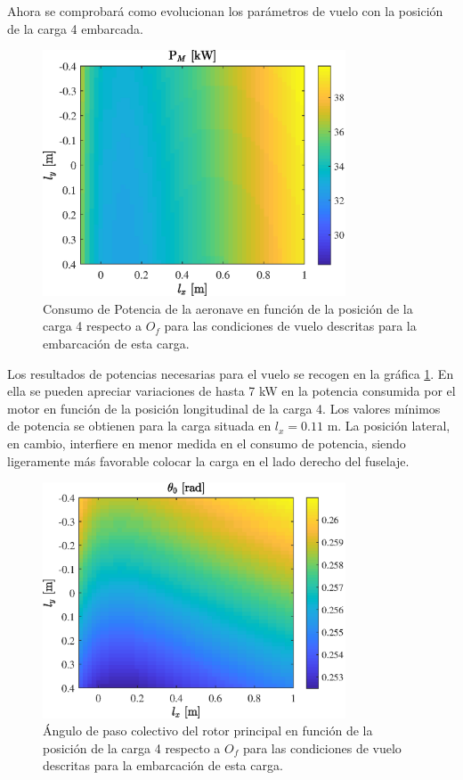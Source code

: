 Ahora se comprobará como evolucionan los parámetros de vuelo con la posición de la carga 4 embarcada.

\begin{figure}
	\centering
	\includegraphics[width=90mm]{graficos/PMSP}
	\caption{Consumo de Potencia de la aeronave en función de la posición de la carga 4 respecto a $O_f$ para las condiciones de vuelo descritas para la embarcación de esta carga.}
	\label{PMSP}
\end{figure}

Los resultados de potencias necesarias para el vuelo se recogen en la gráfica \ref{PMSP}. En ella se pueden apreciar variaciones de hasta 7 kW en la potencia consumida por el motor en función de la posición longitudinal de la carga 4. Los valores mínimos de potencia se obtienen para la carga situada en $l_x=0.11$ m. La posición lateral, en cambio, interfiere en menor medida en el consumo de potencia, siendo ligeramente más favorable colocar la carga en el lado derecho del fuselaje.

\begin{figure}
	\centering
	\includegraphics[width=90mm]{graficos/theta0SP}
	\caption{Ángulo de paso colectivo del rotor principal  en función de la posición de la carga 4 respecto a $O_f$ para las condiciones de vuelo descritas para la embarcación de esta carga.}
	\label{theta0SP}
\end{figure}

